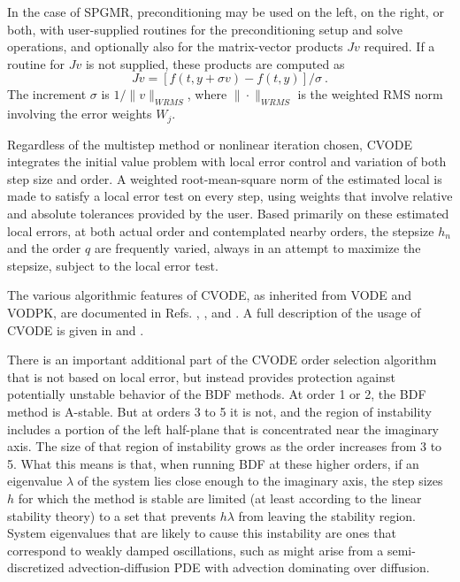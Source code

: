 In the case of SPGMR, preconditioning may be used on the left, on the
right, or both, with user-supplied routines for the preconditioning
setup and solve operations, and optionally also for the matrix-vector
products $Jv$ required.  If a routine for $Jv$ is not supplied, these
products are computed as
\begin{equation}
Jv = [f(t,y+\sigma v) - f(t,y)]/\sigma ~. 
\label{jacobv}
\end{equation}
The increment $\sigma$ is $1/\|v\|_{WRMS}$, where $\|\cdot\|_{WRMS}$
is the weighted RMS norm involving the error weights $W_j$.

Regardless of the multistep method or nonlinear iteration chosen,
CVODE integrates the initial value problem with local error control
and variation of both step size and order.  A weighted root-mean-square
norm of the estimated local is made to satisfy a local error test on
every step, using weights that involve relative and absolute
tolerances provided by the user.  Based primarily on these estimated
local errors, at both actual order and contemplated nearby orders, the
stepsize $h_n$ and the order $q$ are frequently varied, always in an
attempt to maximize the stepsize, subject to the local error test.

The various algorithmic features of CVODE, as inherited from VODE and
VODPK, are documented in Refs. \cite{BBH:89}, \cite{Byr:92}, and
\cite{Hin:00}.  A full description of the usage of CVODE is given in
\cite{CoHi:94} and \cite{ByHi:98}.

There is an important additional part of the CVODE order selection
algorithm that is not based on local error, but instead provides
protection against potentially unstable behavior of the BDF methods.
At order 1 or 2, the BDF method is A-stable.  But at orders 3 to 5 it
is not, and the region of instability includes a portion of the left
half-plane that is concentrated near the imaginary axis.  The size of
that region of instability grows as the order increases from 3 to 5.
What this means is that, when running BDF at these higher orders, if
an eigenvalue $\lambda$ of the system lies close enough to the
imaginary axis, the step sizes $h$ for which the method is stable are
limited (at least according to the linear stability theory) to a set
that prevents $h\lambda$ from leaving the stability region.  System
eigenvalues that are likely to cause this instability are ones that
correspond to weakly damped oscillations, such as might arise from a
semi-discretized advection-diffusion PDE with advection dominating
over diffusion.

